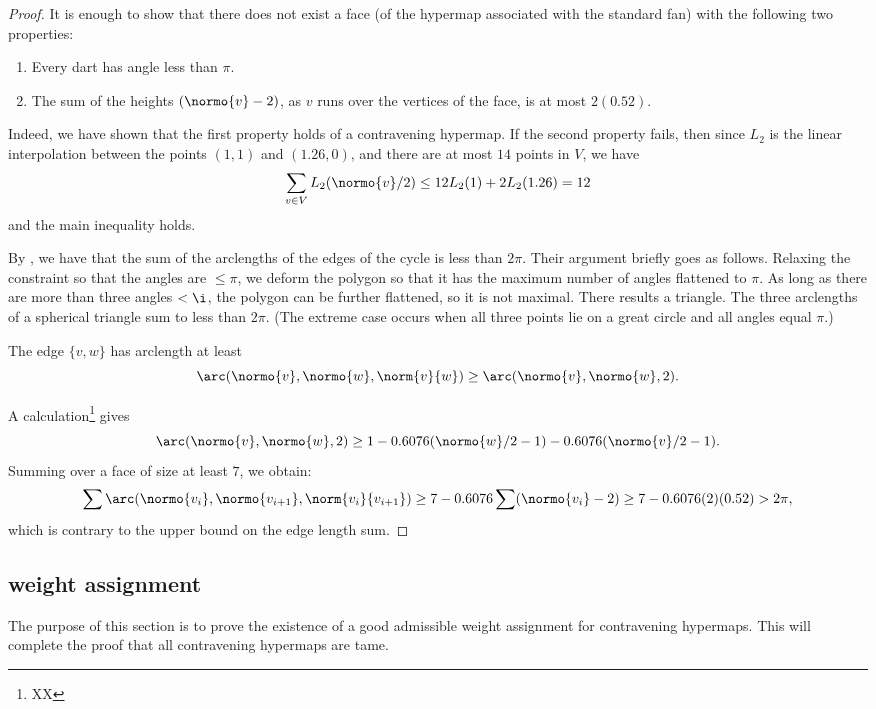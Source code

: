 \begin{proof} It is enough to show that there does not exist a face (of the hypermap associated with the standard fan)
with the following two properties:
\begin{enumerate}
\item Every dart has angle less than $\pi$.
\item The sum of the heights $(\normo{v}-2)$, as $v$ runs
over the vertices of the face, is at most $2(0.52)$.
\end{enumerate}
Indeed, we have shown that the first property holds
of a contravening hypermap.  If the second property fails,
then since $L_2$ is the linear interpolation between
the points $(1,1)$ and $(1.26,0)$, and there are at most
$14$ points in $V$, we have
$$\sum_{v\in V}L_2(\normo{v}/2) \le 12 L_2(1) + 2 L_2(1.26) =12$$
and the main inequality holds.

By \cite{vanderWaerden:1951}, we have that the sum of
the arclengths of the edges of the cycle is less than
$2\pi$.  Their argument briefly goes as follows. Relaxing the constraint so that the angles are $\le \pi$, we deform the polygon so that it has the maximum number of angles flattened to $\pi$.  As long as there are more than three angles $<\i$, the polygon can be further flattened, so it is not maximal.  There results a triangle.  The three arclengths of a spherical triangle sum to less than $2\pi$.  (The extreme case occurs when all three points lie on a great circle and all angles equal $\pi$.)

The edge $\{v,w\}$ has arclength at least
$$
\arc(\normo{v},\normo{w},\norm{v}{w}) \ge \arc(\normo{v},\normo{w},2). 
$$

A calculation\footnote{XX} gives
$$
\arc(\normo{v},\normo{w},2)\ge 1 - 0.6076 (\normo{w}/2 - 1) - 0.6076 (\normo{v}/2 - 1).
$$
Summing over a face of size at least $7$, we obtain:
$$
\sum \arc(\normo{v_i},\normo{v_{i+1}},\norm{v_i}{v_{i+1}})\ge
7 - 0.6076 \sum (\normo{v_i}-2) \ge 7 - 0.6076 (2) (0.52) > 2\pi,
$$
which is contrary to the upper bound on the edge length
sum.
\end{proof}







\subsection{weight assignment}
    \label{sec:weight}

The purpose of this section is to prove the existence of a good
admissible weight assignment for contravening hypermaps.
This will complete the proof that all contravening
hypermaps are tame.

